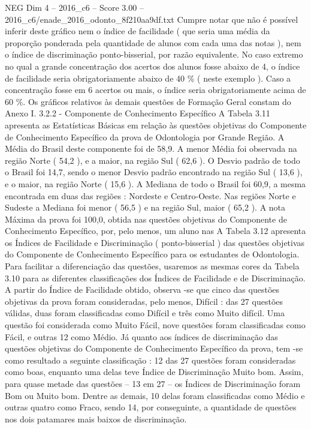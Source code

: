 \begin{textsample}{NEG Dim 4 – 2016\_c6 – Score 3.00 – 2016\_c6/enade\_2016\_odonto\_8f210aa9df.txt}
Cumpre notar que não é possível inferir deste gráfico nem o índice de facilidade ( que seria uma média da proporção ponderada pela quantidade de alunos com cada uma das notas ), nem o índice de discriminação ponto-bisserial, por razão equivalente.
No caso extremo no qual a grande concentração dos acertos dos alunos fosse abaixo de 4, o índice de facilidade seria obrigatoriamente abaixo de 40 \% ( neste exemplo ).
Caso a concentração fosse em 6 acertos ou mais, o índice seria obrigatoriamente acima de 60 \%.
Os gráficos relativos às demais questões de Formação Geral constam do Anexo I. 3.2.2 - Componente de Conhecimento Específico A Tabela 3.11 apresenta as Estatísticas Básicas em relação às questões objetivas do Componente de Conhecimento Específico da prova de Odontologia por Grande Região.
A Média do Brasil deste componente foi de 58,9.
A menor Média foi observada na região Norte ( 54,2 ), e a maior, na região Sul ( 62,6 ).
O Desvio padrão de todo o Brasil foi 14,7, sendo o menor Desvio padrão encontrado na região Sul ( 13,6 ), e o maior, na região Norte ( 15,6 ).
A Mediana de todo o Brasil foi 60,9, a mesma encontrada em duas das regiões : Nordeste e Centro-Oeste.
Nas regiões Norte e Sudeste a Mediana foi menor ( 56,5 ) e na região Sul, maior ( 65,2 ).
A nota Máxima da prova foi 100,0, obtida nas questões objetivas do Componente de Conhecimento Específico, por, pelo menos, um aluno nas A Tabela 3.12 apresenta os Índices de Facilidade e Discriminação ( ponto-bisserial ) das questões objetivas do Componente de Conhecimento Específico para os estudantes de Odontologia.
Para facilitar a diferenciação das questões, usaremos as mesmas cores da Tabela 3.10 para as diferentes classificações dos Índices de Facilidade e de Discriminação.
A partir do Índice de Facilidade obtido, observa -se que cinco das questões objetivas da prova foram consideradas, pelo menos, Difícil : das 27 questões válidas, duas foram classificadas como Difícil e três como Muito difícil.
Uma questão foi considerada como Muito Fácil, nove questões foram classificadas como Fácil, e outras 12 como Médio.
Já quanto aos índices de discriminação das questões objetivas do Componente de Conhecimento Específico da prova, tem -se como resultado a seguinte classificação : 12 das 27 questões foram consideradas como boas, enquanto uma delas teve Índice de Discriminação Muito bom.
Assim, para quase metade das questões – 13 em 27 – os Índices de Discriminação foram Bom ou Muito bom.
Dentre as demais, 10 delas foram classificadas como Médio e outras quatro como Fraco, sendo 14, por conseguinte, a quantidade de questões nos dois patamares mais baixos de discriminação.

\end{textsample}
